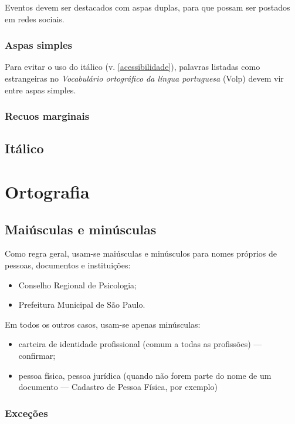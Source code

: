 Eventos devem ser destacados com aspas duplas, para que possam ser postados em redes sociais.

\subsubsection{Aspas simples}

Para evitar o uso do itálico (v. \ref{acessibilidade}), palavras listadas como estrangeiras no \emph{Vocabulário ortográfico da língua portuguesa} (Volp) devem vir entre aspas simples.

\subsubsection{Recuos marginais}

\subsection{Itálico}

\section{Ortografia}

\subsection{Maiúsculas e minúsculas}

Como regra geral, usam-se maiúsculas e minúsculos para nomes próprios de pessoas, documentos e instituições:

\begin{itemize}
\item Conselho Regional de Psicologia;
\item Prefeitura Municipal de São Paulo.
\end{itemize}

Em todos os outros casos, usam-se apenas minúsculas:

\begin{itemize}
    \item carteira de identidade profissional (comum a todas as profissões) --- confirmar;
\item pessoa física, pessoa jurídica (quando não forem parte do nome de um documento --- Cadastro de Pessoa Física, por exemplo)
\end{itemize}

\subsubsection{Exceções}

